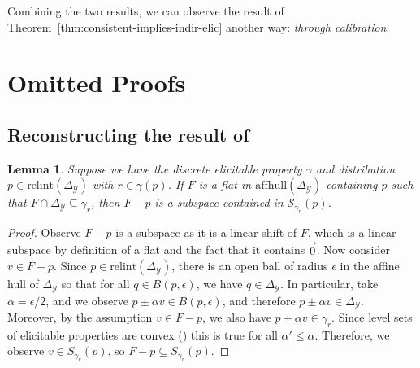 \documentclass{article}
\newcommand{\Comments}{1}
\newcommand{\mynote}[2]{\ifnum\Comments=1\textcolor{#1}{#2}\fi}
\newcommand{\raf}[1]{\mynote{green!80!blue}{[RF: #1]}}
\newcommand{\simplex}{\Delta_\Y}
\newcommand{\relint}[1]{\mathrm{relint}(#1)}
\newcommand{\affhull}{\mathrm{affhull}}
\newcommand{\Sc}{\mathcal{S}}  %
\newcommand{\Y}{\mathcal{Y}}
\newtheorem{lemma}{Lemma}
\begin{document}
Combining the two results, we can observe the result of Theorem~\ref{thm:consistent-implies-indir-elic} another way: \emph{through calibration}.

\section{Omitted Proofs}\label{app:omitted-proofs}

\subsection{Reconstructing the result of~\citet[Theorem 16]{ramaswamy2016convex}}
\begin{lemma}\label{lem:feas-sub-is-a-flat}
	Suppose we have the discrete elicitable property $\gamma$ and distribution $p \in \relint{\simplex}$ with $r \in \gamma(p)$.
	If $F$ is a flat in $\affhull(\simplex)$ containing $p$ such that $F \cap \simplex \subseteq \gamma_r$, then $F - p$ is a subspace contained in $\Sc_{\gamma_r}(p)$.
\end{lemma}
\begin{proof}
	Observe $F-p$ is a subspace as it is a linear shift of $F$, which is a linear subspace by definition of a flat and the fact that it contains $\vec 0$.
	Now consider $v \in F - p$.
	Since $p \in \relint{\simplex}$, there is an open ball of radius $\epsilon$ in the affine hull of $\simplex$ so that for all $q \in B(p, \epsilon)$, we have $q \in \simplex$.
	In particular, take $\alpha = \epsilon / 2$, and we observe $p \pm \alpha v \in B(p, \epsilon)$, and therefore $p \pm \alpha v \in \simplex$.
	Moreover, by the assumption $v \in F - p$, we also have $p \pm \alpha v \in \gamma_r$. 
	Since level sets of elicitable properties are convex (\citep{lambert2009eliciting}) this is true for all $\alpha' \leq \alpha$.
	Therefore, we observe $v \in S_{\gamma_r}(p)$, so $F-p \subseteq S_{\gamma_r}(p)$.
\end{proof}
\end{document}
